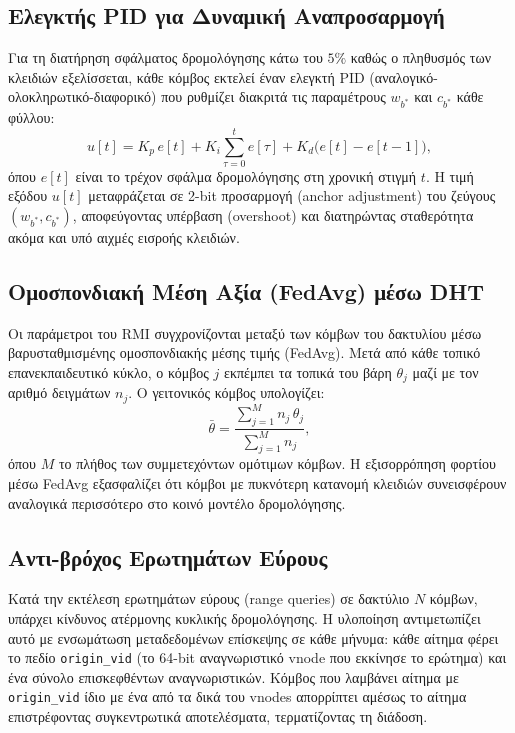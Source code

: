 \subsection{Ελεγκτής PID για Δυναμική Αναπροσαρμογή}
\label{subsec:impl_pid}

Για τη διατήρηση σφάλματος δρομολόγησης κάτω του $5\%$ καθώς ο πληθυσμός των κλειδιών εξελίσσεται, κάθε κόμβος εκτελεί έναν ελεγκτή PID (αναλογικό-ολοκληρωτικό-διαφορικό) που ρυθμίζει διακριτά τις παραμέτρους $w_{b^*}$ και $c_{b^*}$ κάθε φύλλου:
\begin{equation}
\label{eq:pid}
u[t] = K_p\,e[t] + K_i\sum_{\tau=0}^{t}e[\tau] + K_d\bigl(e[t] - e[t-1]\bigr),
\end{equation}
όπου $e[t]$ είναι το τρέχον σφάλμα δρομολόγησης στη χρονική στιγμή $t$. Η τιμή εξόδου $u[t]$ μεταφράζεται σε 2-bit προσαρμογή (anchor adjustment) του ζεύγους $(w_{b^*}, c_{b^*})$, αποφεύγοντας υπέρβαση (overshoot) και διατηρώντας σταθερότητα ακόμα και υπό αιχμές εισροής κλειδιών.

\subsection{Ομοσπονδιακή Μέση Αξία (FedAvg) μέσω DHT}
\label{subsec:impl_fedavg}

Οι παράμετροι του RMI συγχρονίζονται μεταξύ των κόμβων του δακτυλίου μέσω βαρυσταθμισμένης ομοσπονδιακής μέσης τιμής (FedAvg). Μετά από κάθε τοπικό επανεκπαιδευτικό κύκλο, ο κόμβος $j$ εκπέμπει τα τοπικά του βάρη $\theta_j$ μαζί με τον αριθμό δειγμάτων $n_j$. Ο γειτονικός κόμβος υπολογίζει:
\begin{equation}
\label{eq:fedavg}
\bar{\theta} = \frac{\sum_{j=1}^{M} n_j\,\theta_j}{\sum_{j=1}^{M} n_j},
\end{equation}
όπου $M$ το πλήθος των συμμετεχόντων ομότιμων κόμβων. Η εξισορρόπηση φορτίου μέσω FedAvg εξασφαλίζει ότι κόμβοι με πυκνότερη κατανομή κλειδιών συνεισφέρουν αναλογικά περισσότερο στο κοινό μοντέλο δρομολόγησης.

\subsection{Αντι-βρόχος Ερωτημάτων Εύρους}
\label{subsec:impl_range_antiloop}

Κατά την εκτέλεση ερωτημάτων εύρους (range queries) σε δακτύλιο $N$ κόμβων, υπάρχει κίνδυνος ατέρμονης κυκλικής δρομολόγησης. Η υλοποίηση αντιμετωπίζει αυτό με ενσωμάτωση μεταδεδομένων επίσκεψης σε κάθε μήνυμα: κάθε αίτημα φέρει το πεδίο \texttt{origin\_vid} (το 64-bit αναγνωριστικό vnode που εκκίνησε το ερώτημα) και ένα σύνολο επισκεφθέντων αναγνωριστικών. Κόμβος που λαμβάνει αίτημα με \texttt{origin\_vid} ίδιο με ένα από τα δικά του vnodes απορρίπτει αμέσως το αίτημα επιστρέφοντας συγκεντρωτικά αποτελέσματα, τερματίζοντας τη διάδοση.

